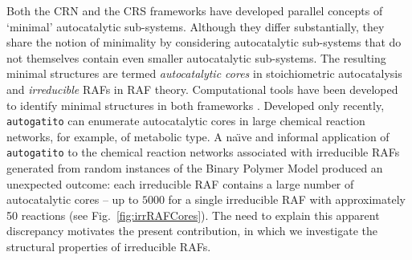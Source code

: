 \documentclass[pdflatex]{sn-jnl}
\theoremstyle{thmstyleone}%
\theoremstyle{examplesty}%
\theoremstyle{thmstylethree}%
\begin{document}
Both the CRN and the CRS frameworks have developed parallel concepts
of `minimal’ autocatalytic sub-systems. Although they differ
substantially, they share the notion of minimality by considering
autocatalytic sub-systems that do not themselves contain even smaller
autocatalytic sub-systems. The resulting minimal structures are termed
\emph{autocatalytic cores} in stoichiometric autocatalysis and
\emph{irreducible} RAFs in RAF theory. Computational tools have been
developed to identify minimal structures in both frameworks 
\cite{kosc_thermodynamic_2025, gagrani_polyhedral_2024, 
golnik_using_2026, hordijk_algorithms_2026}.
Developed only recently, \texttt{autogatito} \cite{golnik_using_2026} can
enumerate autocatalytic cores in large chemical reaction networks, for
example, of metabolic type. A na{\"\i}ve and informal application of
\texttt{autogatito} to the chemical reaction networks associated with
irreducible RAFs generated from random instances of the Binary Polymer
Model \cite{kauffman_autocatalytic_1986} produced an unexpected
outcome: each irreducible RAF contains a large number of autocatalytic 
cores -- up to $5000$ for a single irreducible RAF with approximately 50 
reactions (see Fig.~\ref{fig:irrRAFCores}). The need to
explain this apparent discrepancy motivates the present contribution, in
which we investigate the structural properties of irreducible RAFs.
\end{document}
